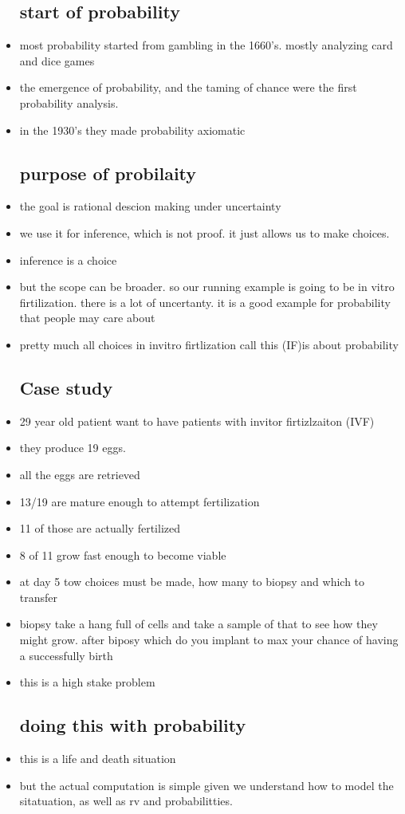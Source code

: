 \documentclass{article}
\begin{document}
\begin{itemize}
\subsection{start of probability}
\item most probability started from gambling in the 1660's. mostly analyzing card and dice games
\item the emergence of probability, and the taming of chance were the first probability analysis. 
\item in the 1930's they made probability axiomatic 
\subsection{purpose of probilaity}
\item the goal is rational descion making under uncertainty 
\item we use it for inference, which is not proof. it just allows us to make choices. 
\item inference is a choice
\item but the scope can be broader. 
\itme so our running example is going to be in vitro firtilization. there is a lot of uncertanty. it is a good example for probability that people may care about 
\item pretty much all choices in invitro firtlization call this (IF)is about probability
\subsection{Case study}
\item 29 year old patient want to have patients with invitor firtizlzaiton (IVF) 
\item they produce 19 eggs.
\item all the eggs are retrieved
\item 13/19 are mature enough to attempt fertilization 
\item 11 of those are actually fertilized 
\item 8 of 11 grow fast enough to become viable 
\item at day 5 tow choices must be made, how many to biopsy and which to transfer
\item biopsy take a hang full of cells and take a sample of that to see how they might grow. 
\iem after biposy which do you implant to max your chance of having a successfully birth 
\item this is a high stake problem 
\subsection{doing this with probability}
\item this is a life and death situation 
\item but the actual computation is simple given we understand how to model the sitatuation, as well as rv and probabilitties. 

\end{itemize}
\end{document}
